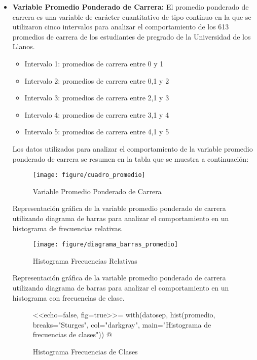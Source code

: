 \begin{itemize}
  	\item \textbf {Variable Promedio Ponderado de Carrera:}
		El promedio ponderado de carrera es una variable de carácter cuantitativo de tipo continuo en la que se utilizaron cinco intervalos para analizar el comportamiento de los 613 promedios de carrera de los estudiantes de pregrado de la Universidad de los Llanos.
   \bigskip
	\begin{itemize}
		\item Intervalo 1: promedios de carrera entre 0 y 1  
		\item Intervalo 2: promedios de carrera entre 0,1 y 2
		\item Intervalo 3: promedios de carrera entre 2,1 y 3
		\item Intervalo 4: promedios de carrera entre 3,1 y 4 
		\item Intervalo 5: promedios de carrera entre 4,1 y 5
	\end{itemize}
	\bigskip
	Los datos utilizados para analizar el comportamiento de la variable promedio ponderado de carrera se resumen en la tabla que se muestra a continuación:
	\bigskip
	
	\begin{figure}[ht]
		\centering
		\texttt{[image: figure/cuadro\_promedio]}
		\caption{Variable Promedio Ponderado de Carrera}
		\label{fig:cuadro_promedio}
	\end{figure}

	Representación gráfica de la variable promedio ponderado de carrera utilizando diagrama de barras para analizar el comportamiento en un histograma de frecuencias relativas.

	\begin{figure}[ht]
		\centering
		\texttt{[image: figure/diagrama\_barras\_promedio]}
		\caption{Histograma Frecuencias Relativas}
		\label{fig:diagrama_barras_promedio}
	\end{figure}

	Representación gráfica de la variable promedio ponderado de carrera utilizando diagrama de barras para analizar el comportamiento en un histograma con frecuencias de clase.

	\begin{figure}[ht]
		\centering
		<<echo=false, fig=true>>=
			with(datosep, hist(promedio, breaks="Sturges", col="darkgray", main="Histograma de frecuencias de clases"))
		@
		\caption{Histograma Frecuencias de Clases}
		\label{fig:barras_promedio_frecuencias_clase}
	\end{figure}




\end{itemize}

